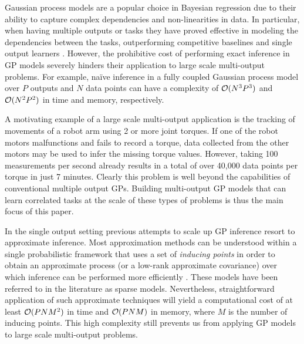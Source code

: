 Gaussian process models  \citep[GPs,][]{rasmussen-williams-book}  are a popular choice in 
Bayesian regression due to their ability to capture complex dependencies and non-linearities in data.
In particular, when having multiple outputs or tasks they have proved effective in modeling 
the dependencies between the tasks, outperforming  competitive baselines and 
single output learners  \citep{bonilla-et-al-nips-08,teh-et-al-aistats-05,alvarez-lawrence-nips-08,wilson-et-al-icml-12}.
However, the prohibitive cost of performing exact inference in  GP models severely hinders 
their application to  large scale multi-output problems. For example, na\"{i}ve inference 
in a fully coupled Gaussian process model over $P$  outputs and $N$ data points can have 
a complexity of $\mathcal{O}(N^3P^3)$  and $\mathcal{O}(N^2P^2)$ in time and memory, respectively.


A motivating  example of a large scale multi-output application 
is the tracking of  movements of a robot arm using 2 or more joint torques. 
If one of the robot motors malfunctions and fails to record a torque, data collected from the 
other motors may be used to infer the missing torque values.
However, taking 100 measurements per second already results in a total of over 40,000 data points 
per torque in just 7 minutes.
Clearly this problem is well beyond the capabilities  of conventional multiple output GPs.
Building  multi-output GP models that can learn correlated tasks at the scale of 
these types of problems  is thus the main focus of this paper.

In the single output setting previous attempts to scale up  GP inference 
resort to approximate inference. Most  approximation methods  
 can be understood 
within a single probabilistic framework that uses a set of \emph{inducing points}  in order to 
obtain an approximate process (or a low-rank approximate covariance) over which inference can be 
performed more efficiently \citep{quinonero2005unifying}. These models have been referred 
to in the literature as sparse models. 
Nevertheless, straightforward application of such approximate techniques will yield a computational 
cost of at least $\mathcal{O}(PNM^2)$ in time and  $\mathcal{O}(PNM)$ in memory, where 
$M$ is the number of inducing points. This high complexity still prevents us from applying GP models 
to  large scale multi-output problems.

